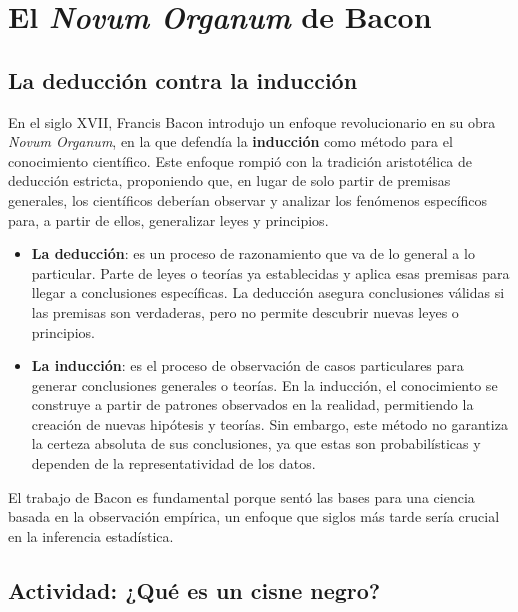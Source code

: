 \documentclass[
  letterpaper,
  DIV=11,
  numbers=noendperiod]{scrreprt}
\begin{document}
\chapter{\texorpdfstring{El \emph{Novum Organum} de
Bacon}{El Novum Organum de Bacon}}\label{el-novum-organum-de-bacon}

\section{La deducción contra la
inducción}\label{la-deducciuxf3n-contra-la-inducciuxf3n}

En el siglo XVII, Francis Bacon introdujo un enfoque revolucionario en
su obra \emph{Novum Organum}, en la que defendía la \textbf{inducción}
como método para el conocimiento científico. Este enfoque rompió con la
tradición aristotélica de deducción estricta, proponiendo que, en lugar
de solo partir de premisas generales, los científicos deberían observar
y analizar los fenómenos específicos para, a partir de ellos,
generalizar leyes y principios.

\begin{itemize}
\item
  \textbf{La deducción}: es un proceso de razonamiento que va de lo
  general a lo particular. Parte de leyes o teorías ya establecidas y
  aplica esas premisas para llegar a conclusiones específicas. La
  deducción asegura conclusiones válidas si las premisas son verdaderas,
  pero no permite descubrir nuevas leyes o principios.
\item
  \textbf{La inducción}: es el proceso de observación de casos
  particulares para generar conclusiones generales o teorías. En la
  inducción, el conocimiento se construye a partir de patrones
  observados en la realidad, permitiendo la creación de nuevas hipótesis
  y teorías. Sin embargo, este método no garantiza la certeza absoluta
  de sus conclusiones, ya que estas son probabilísticas y dependen de la
  representatividad de los datos.
\end{itemize}

El trabajo de Bacon es fundamental porque sentó las bases para una
ciencia basada en la observación empírica, un enfoque que siglos más
tarde sería crucial en la inferencia estadística.

\section{Actividad: ¿Qué es un cisne
negro?}\label{actividad-quuxe9-es-un-cisne-negro}
\end{document}

